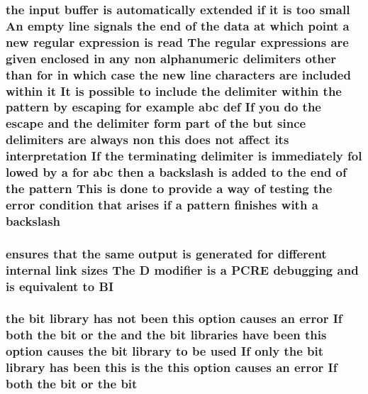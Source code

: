 \subsubsection[{\texorpdfstring{backslash}{backslash}}]{\setlength{\rightskip}{0pt plus 5cm}the {\bf input} {\bf buffer} {\bf is} automatically extended {\bf if} {\bf it} {\bf is} too small An {\bf empty} {\bf line} signals the {\bf end} {\bf of} the {\bf data} at {\bf which} {\bf point} {\bf a} new regular {\bf expression} {\bf is} {\bf read} The regular {\bf expressions} {\bf are} {\bf given} enclosed {\bf in} {\bf any} non {\bf alphanumeric} delimiters other {\bf than} for {\bf in} {\bf which} {\bf case} the new {\bf line} {\bf characters} {\bf are} {\bf included} within {\bf it} It {\bf is} {\bf possible} {\bf to} {\bf include} the delimiter within the {\bf pattern} by escaping for {\bf example} {\bf abc} def If you {\bf do} the escape and the delimiter form part {\bf of} the but since delimiters {\bf are} always non {\bf this} does {\bf not} affect its interpretation If the terminating delimiter {\bf is} immediately fol lowed by {\bf a} for {\bf abc} then {\bf a} backslash {\bf is} added {\bf to} the {\bf end} {\bf of} the {\bf pattern} This {\bf is} {\bf done} {\bf to} provide {\bf a} {\bf way} {\bf of} testing the {\bf error} condition that {\bf arises} {\bf if} {\bf a} {\bf pattern} finishes {\bf with} {\bf a} backslash}\hypertarget{pcretest_8txt_a7406c49d0eceff869220e70fa1d3350c}{}\label{pcretest_8txt_a7406c49d0eceff869220e70fa1d3350c}
\subsubsection[{\texorpdfstring{BI}{BI}}]{ ensures that the same {\bf output} {\bf is} {\bf generated} for different internal link sizes The {\bf D} {\bf modifier} {\bf is} {\bf a} {\bf P\+C\+RE} debugging and {\bf is} equivalent {\bf to} BI}\hypertarget{pcretest_8txt_a36b278a955d40fa0d889ed8d8edbebd1}{}\label{pcretest_8txt_a36b278a955d40fa0d889ed8d8edbebd1}
\subsubsection[{\texorpdfstring{bit}{bit}}]{ the bit {\bf library} has {\bf not} been {\bf this} {\bf option} causes an {\bf error} If both the bit {\bf or} the and the bit {\bf libraries} have been {\bf this} {\bf option} causes the bit {\bf library} {\bf to} {\bf be} {\bf used} If only the bit {\bf library} has been {\bf this} {\bf is} the {\bf this} {\bf option} causes an {\bf error} If both the bit {\bf or} the bit}\hypertarget{pcretest_8txt_aeddb586b79a44fb202dde924852cbbf6}{}\label{pcretest_8txt_aeddb586b79a44fb202dde924852cbbf6}
